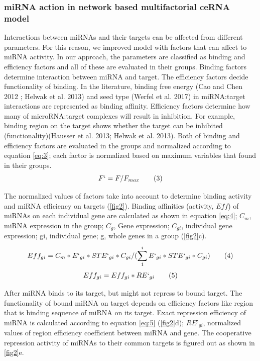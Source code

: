 \documentclass[]{article}
\begin{document}
\hypertarget{mirna-action-in-network-based-multifactorial-cerna-model}{%
\subsubsection{miRNA action in network based multifactorial ceRNA
model}\label{mirna-action-in-network-based-multifactorial-cerna-model}}

Interactions between miRNAs and their targets can be affected from
different parameters. For this reason, we improved model with factors
that can affect to miRNA activity. In our approach, the parameters are
classified as binding and efficiency factors and all of these are
evaluated in their groups. Binding factors determine interaction between
miRNA and target. The efficiency factors decide functionality of
binding. In the literature, binding free energy (Cao and Chen 2012 ;
Helwak et al. 2013) and seed type (Werfel et al. 2017) in miRNA:target
interactions are represented as binding affinity. Efficiency factors
determine how many of microRNA:target complexes will result in
inhibition. For example, binding region on the target shows whether the
target can be inhibited (functionality)(Hausser et al. 2013; Helwak et
al. 2013). Both of binding and efficiency factors are evaluated in the
groups and normalized according to equation \eqref{eq:3}; each factor is
normalized based on maximum variables that found in their groups.
\begin{equation}
F`= F/F_{max} \tag{3}\label{eq:3}
\end{equation}

The normalized values of factors take into account to determine binding
activity and miRNA efficiency on targets (\autoref{fig2}). Binding
affinities (activity, \(Eff\)) of miRNAs on each individual gene are
calculated as shown in equation \eqref{eq:4}; \(C_m\), miRNA expression
in the group; \(C_g\), Gene expression; \(C_{gi}\), individual gene
expression; gi, individual gene; g, whole genes in a group
(\autoref{fig2}c). \begin{equation}
Eff_{gi}= C_m * E`_{gi}*STE`_{gi}*C_{gi}/(\sum_{1}^{i} E`_{gi}*STE`_{gi}*C_{gi}) \tag{4}\label{eq:4}
\end{equation} \begin{equation}
Eff_{gi}= Eff_{gi}*RE`_{gi} \tag{5}\label{eq:5}
\end{equation}

After miRNA binds to its target, but might not repress to bound target.
The functionality of bound miRNA on target depends on efficiency factors
like region that is binding sequence of miRNA on its target. Exact
repression efficiency of miRNA is calculated according to equation
\eqref{eq:5} (\autoref{fig2}d); \(RE’_{gi}\), normalized values of
region efficiency coefficient between miRNA and gene. The cooperative
repression activity of miRNAs to their common targets is figured out as
shown in \autoref{fig2}e.
\end{document}
